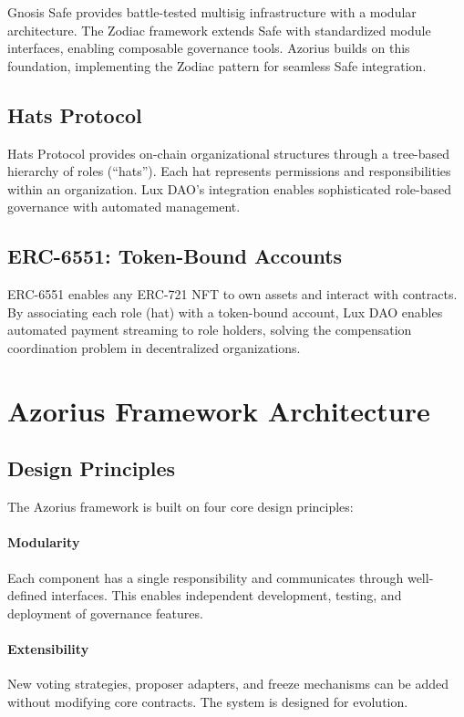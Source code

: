 \documentclass[11pt,a4paper]{article}
\begin{document}
Gnosis Safe \cite{safe} provides battle-tested multisig infrastructure with a modular architecture. The Zodiac framework \cite{zodiac} extends Safe with standardized module interfaces, enabling composable governance tools. Azorius builds on this foundation, implementing the Zodiac pattern for seamless Safe integration.

\subsection{Hats Protocol}

Hats Protocol \cite{hats} provides on-chain organizational structures through a tree-based hierarchy of roles (``hats''). Each hat represents permissions and responsibilities within an organization. Lux DAO's integration enables sophisticated role-based governance with automated management.

\subsection{ERC-6551: Token-Bound Accounts}

ERC-6551 \cite{erc6551} enables any ERC-721 NFT to own assets and interact with contracts. By associating each role (hat) with a token-bound account, Lux DAO enables automated payment streaming to role holders, solving the compensation coordination problem in decentralized organizations.

\section{Azorius Framework Architecture}

\subsection{Design Principles}

The Azorius framework is built on four core design principles:

\paragraph{Modularity} Each component has a single responsibility and communicates through well-defined interfaces. This enables independent development, testing, and deployment of governance features.

\paragraph{Extensibility} New voting strategies, proposer adapters, and freeze mechanisms can be added without modifying core contracts. The system is designed for evolution.
\end{document}
